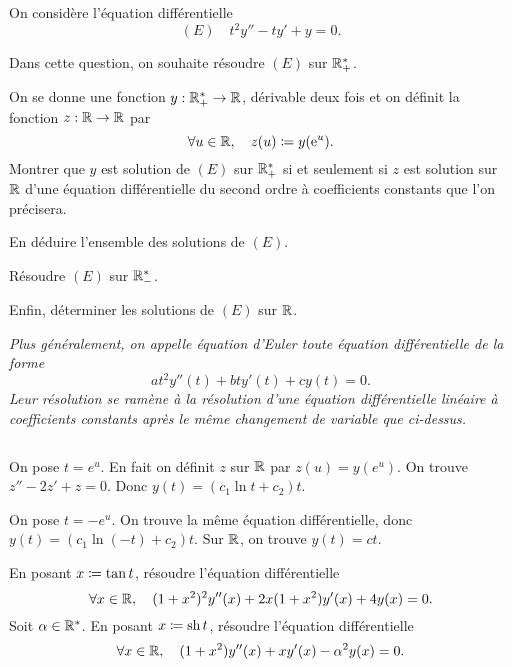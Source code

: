 \documentclass{magnolia}
\begin{document}






On considère l'équation différentielle
\[(E) \quad t^2y''-ty'+y=0.\]
\begin{questions}
\item Dans cette question, on souhaite résoudre $(E)$ sur $\mathbb{R}_+^*$.
  \begin{questions}
  \item  On se donne
  une fonction $y:\mathbb{R}_+^*\to\mathbb{R}$, dérivable deux fois et on définit la fonction $z:\mathbb{R}\to\mathbb{R}$
  par
  \[\forall u\in\mathbb{R},\quad z(u)\coloneqq y({\rm e}^u).\]
  Montrer que $y$ est solution de $(E)$ sur $\mathbb{R}_+^*$ si et
    seulement si $z$ est solution sur $\mathbb{R}$ d'une équation différentielle du second ordre
    à coefficients constants que l'on précisera.
  \item En déduire l'ensemble des solutions de $(E)$.
  \end{questions}
\item Résoudre $(E)$ sur $\mathbb{R}_-^*$.
\item Enfin, déterminer les solutions de $(E)$ sur $\mathbb{R}$.
\end{questions}
\emph{Plus généralement, on appelle équation d'Euler toute équation différentielle
de la forme
\[at^2 y''(t)+ bt y'(t)+ cy(t)=0.\]
Leur résolution se ramène à la résolution d'une équation différentielle linéaire à
coefficients constants après le même changement de variable que ci-dessus.}
\begin{sol}
$\quad$
\begin{questions}
\question
  \begin{questions}
  \question On pose $t=e^u$. En fait on définit $z$ sur $\mathbb{R}$ par $z(u)=y(e^u)$.
    On trouve $z''-2z'+z=0$.
  \question Donc $y(t)=(c_1\ln t+c_2)t$.
  \end{questions}
\question On pose $t=-e^u$. On trouve la même équation différentielle,
  donc $y(t)=(c_1\ln(-t)+c_2)t$. Sur $\mathbb{R}$, on trouve $y(t)=ct$.
\end{questions}
\end{sol}

\begin{questions}
\question En posant $x\coloneqq \tan t$, résoudre l'équation différentielle
  \[\forall x\in\mathbb{R},\quad (1+x^2)^2 y''(x)+2x(1+x^2)y'(x)+4y(x)=0.\]
\question Soit $\alpha\in{\mathbb{R}^*}$. En posant $x\coloneqq \operatorname{sh} t$, résoudre l'équation différentielle
  \[\forall x\in\mathbb{R},\quad (1+x^2)y''(x)+xy'(x)-\alpha^2 y(x)=0.\]
\end{questions}
\end{document}
